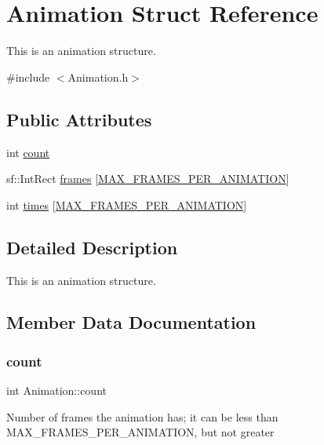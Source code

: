 \hypertarget{struct_animation}{}\section{Animation Struct Reference}
\label{struct_animation}


This is an animation structure.  




{\ttfamily \#include $<$Animation.\+h$>$}

\subsection*{Public Attributes}
\begin{DoxyCompactItemize}
\item 
int \hyperlink{struct_animation_a988e8e0d532dd6b3d581cac9447568ea}{count}
\item 
sf\+::\+Int\+Rect \hyperlink{struct_animation_aa7b68d6cf873a92e2179b618379e3e8c}{frames} \mbox{[}\hyperlink{_animation_8h_aefcfbff62033a5293157520b346713fb}{M\+A\+X\+\_\+\+F\+R\+A\+M\+E\+S\+\_\+\+P\+E\+R\+\_\+\+A\+N\+I\+M\+A\+T\+I\+ON}\mbox{]}
\item 
int \hyperlink{struct_animation_a3ba00e5e751106d59653fb6aaed2273a}{times} \mbox{[}\hyperlink{_animation_8h_aefcfbff62033a5293157520b346713fb}{M\+A\+X\+\_\+\+F\+R\+A\+M\+E\+S\+\_\+\+P\+E\+R\+\_\+\+A\+N\+I\+M\+A\+T\+I\+ON}\mbox{]}
\end{DoxyCompactItemize}


\subsection{Detailed Description}
This is an animation structure. 

\subsection{Member Data Documentation}
\mbox{\label{struct_animation_a988e8e0d532dd6b3d581cac9447568ea}} 
\subsubsection{\texorpdfstring{count}{count}}
{\footnotesize\ttfamily int Animation\+::count}

Number of frames the animation has; it can be less than M\+A\+X\+\_\+\+F\+R\+A\+M\+E\+S\+\_\+\+P\+E\+R\+\_\+\+A\+N\+I\+M\+A\+T\+I\+ON, but not greater \mbox{\label{struct_animation_aa7b68d6cf873a92e2179b618379e3e8c}} 

